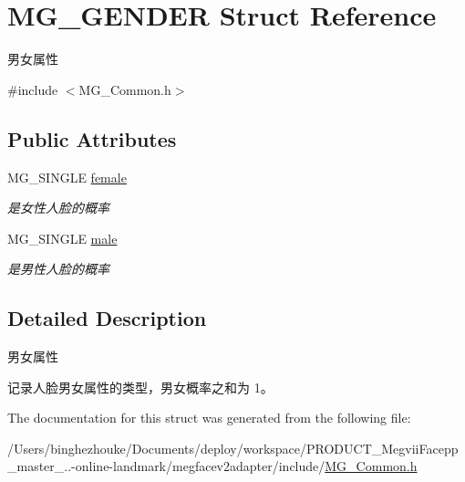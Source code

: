 \hypertarget{struct_m_g___g_e_n_d_e_r}{}\section{M\+G\+\_\+\+G\+E\+N\+D\+ER Struct Reference}
\label{struct_m_g___g_e_n_d_e_r}


男女属性  




{\ttfamily \#include $<$M\+G\+\_\+\+Common.\+h$>$}

\subsection*{Public Attributes}
\begin{DoxyCompactItemize}
\item 
\mbox{\label{struct_m_g___g_e_n_d_e_r_af2af039fb84764abb99ff7d2cd31af05}} 
M\+G\+\_\+\+S\+I\+N\+G\+LE \hyperlink{struct_m_g___g_e_n_d_e_r_af2af039fb84764abb99ff7d2cd31af05}{female}
\begin{DoxyCompactList}\small\item\em 是女性人脸的概率 \end{DoxyCompactList}\item 
\mbox{\label{struct_m_g___g_e_n_d_e_r_a5e590abc870bd200985d5f635f9b8187}} 
M\+G\+\_\+\+S\+I\+N\+G\+LE \hyperlink{struct_m_g___g_e_n_d_e_r_a5e590abc870bd200985d5f635f9b8187}{male}
\begin{DoxyCompactList}\small\item\em 是男性人脸的概率 \end{DoxyCompactList}\end{DoxyCompactItemize}


\subsection{Detailed Description}
男女属性 

记录人脸男女属性的类型，男女概率之和为 1。 

The documentation for this struct was generated from the following file\+:\begin{DoxyCompactItemize}
\item 
/\+Users/binghezhouke/\+Documents/deploy/workspace/\+P\+R\+O\+D\+U\+C\+T\+\_\+\+Megvii\+Facepp\+\_\+master\+\_..-\/online-\/landmark/megfacev2adapter/include/\hyperlink{_m_g___common_8h}{M\+G\+\_\+\+Common.\+h}\end{DoxyCompactItemize}
